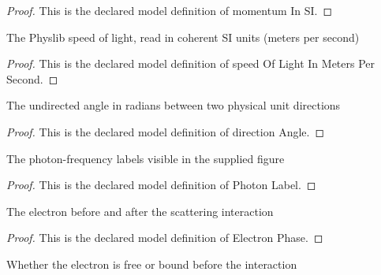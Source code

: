 \begin{proof}
  This is the declared model definition of momentum In SI.
\end{proof}
\begin{definition}
  \label{def:physics:phyx-mini-0548:phyxminiproblems-problemphyxmini0548-speedoflightinmeterspersecond}
  The Physlib speed of light, read in coherent SI units (meters per second)
\end{definition}
\begin{proof}
  This is the declared model definition of speed Of Light In Meters Per Second.
\end{proof}
\begin{definition}
  \label{def:physics:phyx-mini-0548:phyxminiproblems-problemphyxmini0548-directionangle}
  The undirected angle in radians between two physical unit directions
\end{definition}
\begin{proof}
  This is the declared model definition of direction Angle.
\end{proof}
\begin{definition}
  \label{def:physics:phyx-mini-0548:phyxminiproblems-problemphyxmini0548-photonlabel}
  The photon-frequency labels visible in the supplied figure
\end{definition}
\begin{proof}
  This is the declared model definition of Photon Label.
\end{proof}
\begin{definition}
  \label{def:physics:phyx-mini-0548:phyxminiproblems-problemphyxmini0548-electronphase}
  The electron before and after the scattering interaction
\end{definition}
\begin{proof}
  This is the declared model definition of Electron Phase.
\end{proof}
\begin{definition}
  \label{def:physics:phyx-mini-0548:phyxminiproblems-problemphyxmini0548-electronbindingstate}
  Whether the electron is free or bound before the interaction
\end{definition}
